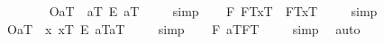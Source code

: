 \begin{isabellebody}
\ \isamarkupfalse%
%
\isadelimproof
\ %
\endisadelimproof
%
\isatagproof
{}\isamarkupfalse%
\ %
%
\endisatagproof
{\isafoldproof}%
%
\isadelimproof
%
\endisadelimproof
\isanewline
\ \isamarkupfalse%
\ {\isachardoublequoteopen}{\isacharbrackleft}{\isasymlparr}O{\isacharbang}{\isacharcomma}a\isactrlsup T{\isasymrparr}\ \isactrlbold {\isasymrightarrow}\ a\isactrlsup T\ \isactrlbold {\isacharequal}\isactrlsub E\ a\isactrlsup T{\isacharbrackright}\ {\isacharequal}\ {\isasymtop}{\isachardoublequoteclose}%
\isadelimproof
\ %
\endisadelimproof
%
\isatagproof
{}\isamarkupfalse%
\ simp\ \isamarkupfalse%
%
\endisatagproof
{\isafoldproof}%
%
\isadelimproof
%
\endisadelimproof
\isanewline
\isanewline
\ \isamarkupfalse%
\ {\isachardoublequoteopen}{\isacharbrackleft}{\isacharparenleft}\isactrlbold {\isasymforall}F{\isachardot}\ {\isasymlparr}F\isactrlsup T{\isacharcomma}x\isactrlsup T{\isasymrparr}\ \isactrlbold {\isasymequiv}\ {\isasymlparr}F\isactrlsup T{\isacharcomma}x\isactrlsup T{\isasymrparr}{\isacharparenright}{\isacharbrackright}\ {\isacharequal}\ {\isasymtop}{\isachardoublequoteclose}%
\isadelimproof
\ %
\endisadelimproof
%
\isatagproof
{}\isamarkupfalse%
\ simp\ \isamarkupfalse%
%
\endisatagproof
{\isafoldproof}%
%
\isadelimproof
%
\endisadelimproof
\isanewline
\ \isamarkupfalse%
\ {\isachardoublequoteopen}{\isacharbrackleft}{\isasymlparr}O{\isacharbang}{\isacharcomma}a\isactrlsup T{\isasymrparr}\ \isactrlbold {\isasymrightarrow}\ {\isasymlparr}\isactrlbold {\isasymlambda}x{\isachardot}\ x\isactrlsup T\ \isactrlbold {\isacharequal}\isactrlsub E\ a\isactrlsup T{\isacharcomma}a\isactrlsup T{\isasymrparr}{\isacharbrackright}\ {\isacharequal}\ {\isasymtop}{\isachardoublequoteclose}%
\isadelimproof
\ %
\endisadelimproof
%
\isatagproof
{}\isamarkupfalse%
\ simp\ \isamarkupfalse%
%
\endisatagproof
{\isafoldproof}%
%
\isadelimproof
%
\endisadelimproof
\isanewline
\isanewline
\ \isamarkupfalse%
\ {\isachardoublequoteopen}{\isacharbrackleft}{\isacharparenleft}\isactrlbold {\isasymexists}F{\isachardot}\ {\isasymlbrace}a\isactrlsup T{\isacharcomma}F\isactrlsup T{\isasymrbrace}{\isacharparenright}{\isacharbrackright}\ {\isacharequal}\ {\isasymtop}{\isachardoublequoteclose}%
\isadelimproof
\ %
\endisadelimproof
%
\isatagproof
{}\isamarkupfalse%
\ simp\ \isamarkupfalse%
\ auto%
\endisatagproof
{\isafoldproof}%

\end{isabellebody}
